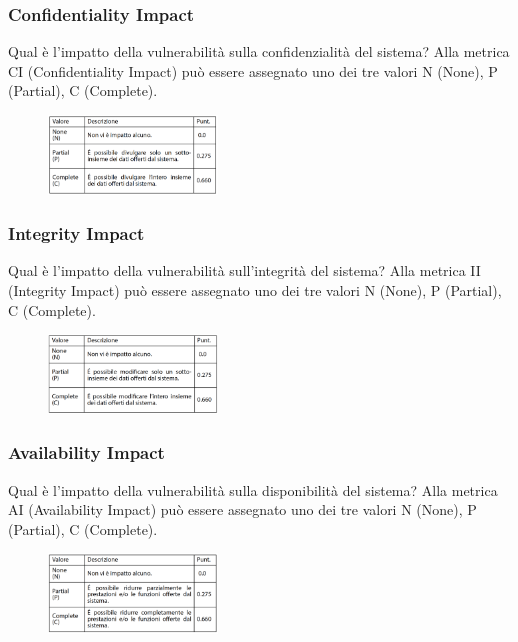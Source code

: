 \subsubsection{Confidentiality Impact}
Qual è l’impatto della vulnerabilità
sulla confidenzialità del sistema? Alla metrica CI (Confidentiality Impact) può essere assegnato uno
dei tre valori N (None), P (Partial), C (Complete).

\begin{figure}[hbpt!]
    \centering
    \includegraphics[width=0.4\textwidth]{./Images/cap2/2.11.png}
\end{figure}
\FloatBarrier

\subsubsection{Integrity Impact}
Qual è l’impatto della vulnerabilità
sull’integrità del sistema? Alla metrica II (Integrity Impact) può essere assegnato uno
dei tre valori N (None), P (Partial), C (Complete).

\begin{figure}[hbpt!]
    \centering
    \includegraphics[width=0.4\textwidth]{./Images/cap2/2.12.png}
\end{figure}
\FloatBarrier

\subsubsection{Availability Impact}
Qual è l’impatto della vulnerabilità
sulla disponibilità del sistema? Alla metrica AI (Availability Impact) può essere assegnato uno
dei tre valori N (None), P (Partial), C (Complete).

\begin{figure}[hbpt!]
    \centering
    \includegraphics[width=0.4\textwidth]{./Images/cap2/2.13.png}
\end{figure}
\FloatBarrier

